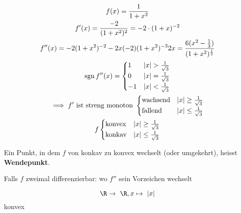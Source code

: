 \begin{bsp*}[note = cont.]
	\begin{gather*}
		f(x) = \frac{1}{1+x^2} \\
		f'(x) = \frac{-2}{(1+x^2)^2} = -2 \cdot (1+x)^{-2} \\
		f''(x) = -2(1+x^2)^{-2} - 2x (-2)(1+x^2)^{-3} 2x = \frac{6(x^2 - \frac{1}{3})}{(1+x^2)^{\frac{1}{3}}} \\
		\sgn f''(x) = \begin{cases}
			1	&\abs{x} > \frac{1}{\sqrt{3}}	\\
			0	&\abs{x} = \frac{1}{\sqrt{3}}	\\
			-1	&\abs{x} < \frac{1}{\sqrt{3}}	
		\end{cases} \\
		\implies f' \text{ ist streng monoton } \begin{cases}
			\text{wachsend}		&\abs{x} \geq \frac{1}{\sqrt{3}}	\\
			\text{fallend}		&\abs{x} \leq \frac{1}{\sqrt{3}}	
		\end{cases} \\
		f \begin{cases}
			\text{konvex}	&\abs{x} \geq \frac{1}{\sqrt{3}}	\\
			\text{konkav}	&\abs{x} \leq \frac{1}{\sqrt{3}} 	
		\end{cases}
	\end{gather*}
\end{bsp*}
\begin{def*}[note = Wendepunkt , index = Wendepunkt]
	Ein Punkt, in dem $f$ von konkav zu konvex wechselt (oder umgekehrt), heisst \textbf{Wendepunkt}. \\
	\begin{bem}
		Falls $f$ zweimal differenzierbar: wo $f''$ sein Vorzeichen wechselt
	\end{bem}
\end{def*}
\begin{bsp*}
	\[ \R \rightarrow \R , x \mapsto \abs{x} \]
	konvex
\end{bsp*}
